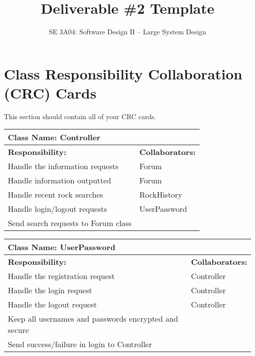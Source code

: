 \documentclass[]{article}
\title{Deliverable \#2 Template}
\author{SE 3A04: Software Design II -- Large System Design}
\date{}
\begin{document}
\maketitle	

\section{Class Responsibility Collaboration (CRC) Cards}
\label{sec:class_responsibility_collaboration_crc_cards}
This section should contain all of your CRC cards.

\begin{table}[ht]
	\centering
	\begin{tabular}{|p{8cm}|p{8cm}|}
		\hline 
		\multicolumn{2}{|l|}{\textbf{Class Name: Controller}} \\
		\hline
		\textbf{Responsibility:} & \textbf{Collaborators:} \\
		\hline
		Handle the information requests & Forum\\
		\hline
		Handle information outputted & Forum\\
		\hline
		Handle recent rock searches & RockHistory\\
		\hline
		Handle login/logout requests & UserPassword\\
		\hline
		Send search requests to Forum class & \\
		\hline 		
	\end{tabular}
\end{table}

\begin{table}[ht]
	\centering
	\begin{tabular}{|p{8cm}|p{8cm}|}
		\hline 
		\multicolumn{2}{|l|}{\textbf{Class Name: UserPassword}} \\
		\hline
		\textbf{Responsibility:} & \textbf{Collaborators:} \\
		\hline
		Handle the registration request & Controller\\
		\hline			
		Handle the login request & Controller\\
		\hline
		Handle the logout request & Controller\\
		\hline
		Keep all usernames and passwords encrypted and secure & \\
		\hline
		Send success/failure in login to Controller & \\
		\hline						
	\end{tabular}
\end{table}
\end{document}
